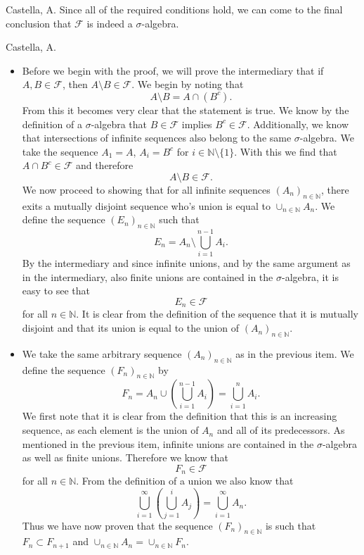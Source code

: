 \begin{solution}[2.4]{Castella, A.}
    Since all of the required conditions hold, we can come to the final conclusion that $\mathcal{F}$ is indeed a $\sigma$-algebra.
\end{solution}

\begin{solution}[2.5]{Castella, A.}
\begin{itemize}
    \item Before we begin with the proof, we will prove the intermediary that if $A,B \in \mathcal{F}$, then $A \setminus B \in \mathcal{F}$. We begin by noting that
    $$
        A \setminus B = A \cap (B^c).
    $$
    From this it becomes very clear that the statement is true. We know by the definition of a $\sigma$-algebra that $B \in \mathcal{F}$ implies $B^c \in \mathcal{F}$. Additionally, we know that intersections of infinite sequences also belong to the same $\sigma$-algebra. We take the sequence $A_1 = A$, $A_i = B^c$ for $i \in \mathbb{N}\setminus\{1\}$. With this we find that $A \cap B^c \in \mathcal{F}$ and therefore
    $$
        A\setminus B \in \mathcal{F}.
    $$
    We now proceed to showing that for all infinite sequences $(A_n)_{n\in\mathbb{N}}$, there exits a mutually disjoint sequence who's union is equal to $\cup_{n\in\mathbb{N}}A_n$. We define the sequence $(E_n)_{n\in\mathbb{N}}$ such that
    $$
        E_n = A_n \setminus \bigcup_{i=1}^{n-1}A_i.
    $$
    By the intermediary and since infinite unions, and by the same argument as in the intermediary, also finite unions are contained in the $\sigma$-algebra, it is easy to see that
    $$
        E_n \in \mathcal{F}
    $$
    for all $n\in\mathbb{N}$. It is clear from the definition of the sequence that it is mutually disjoint and that its union is equal to the union of $(A_n)_{n\in\mathbb{N}}$.
    \item We take the same arbitrary sequence $(A_n)_{n\in\mathbb{N}}$ as in the previous item. We define the sequence $(F_n)_{n\in\mathbb{N}}$ by
    $$
        F_n = A_n \cup \left(\bigcup_{i=1}^{n-1}A_i\right) = \bigcup_{i=1}^n A_i.
    $$
    We first note that it is clear from the definition that this is an increasing sequence, as each element is the union of $A_n$ and all of its predecessors. As mentioned in the previous item, infinite unions are contained in the $\sigma$-algebra as well as finite unions. Therefore we know that
    $$
        F_n \in \mathcal{F}
    $$
    for all $n \in \mathbb{N}$. From the definition of a union we also know that
    $$
        \bigcup_{i=1}^\infty \left(\bigcup_{j=1}^i A_j\right) = \bigcup_{i=1}^\infty A_n.
    $$
    Thus we have now proven that the sequence $(F_n)_{n\in\mathbb{N}}$ is such that $F_n \subset F_{n+1}$ and $\cup_{n\in\mathbb{N}}A_n = \cup_{n\in\mathbb{N}}F_n$.
\end{itemize}
\end{solution}


